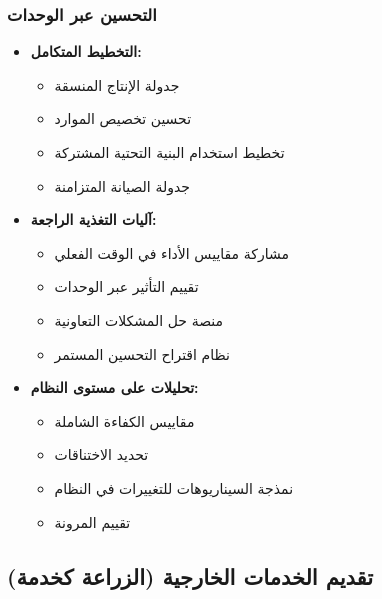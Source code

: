 \subsubsection{التحسين عبر الوحدات}
\begin{itemize}
    \item \textbf{التخطيط المتكامل:}
    \begin{itemize}
        \item جدولة الإنتاج المنسقة
        \item تحسين تخصيص الموارد
        \item تخطيط استخدام البنية التحتية المشتركة
        \item جدولة الصيانة المتزامنة
    \end{itemize}
    
    \item \textbf{آليات التغذية الراجعة:}
    \begin{itemize}
        \item مشاركة مقاييس الأداء في الوقت الفعلي
        \item تقييم التأثير عبر الوحدات
        \item منصة حل المشكلات التعاونية
        \item نظام اقتراح التحسين المستمر
    \end{itemize}
    
    \item \textbf{تحليلات على مستوى النظام:}
    \begin{itemize}
        \item مقاييس الكفاءة الشاملة
        \item تحديد الاختناقات
        \item نمذجة السيناريوهات للتغييرات في النظام
        \item تقييم المرونة
    \end{itemize}
\end{itemize}

\subsection{تقديم الخدمات الخارجية (الزراعة كخدمة)}

